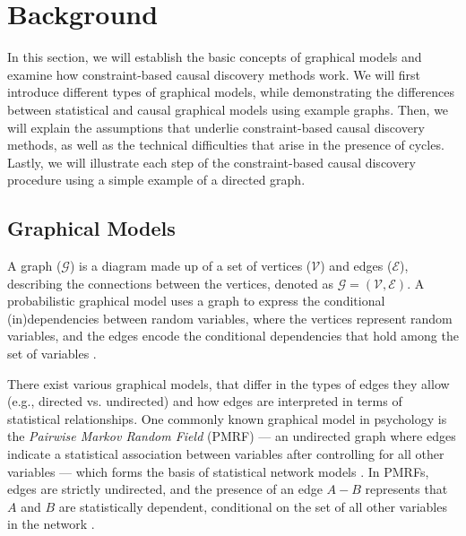 \documentclass[twoside, 11pt]{article}
\begin{document}


\section{Background}
In this section, we will establish the basic concepts of graphical models and examine how constraint-based causal discovery methods work. We will first introduce different types of graphical models, while demonstrating the differences between statistical and causal graphical models using example graphs. Then, we will explain the assumptions that underlie constraint-based causal discovery methods, as well as the technical difficulties that arise in the presence of cycles. Lastly, we will illustrate each step of the constraint-based causal discovery procedure using a simple example of a directed graph.


\subsection{Graphical Models} 

A graph ($\mathcal{G}$) is a diagram made up of a set of vertices ($\mathcal{V}$) and edges ($\mathcal{E}$), describing the connections between the vertices, denoted as $\mathcal{G} = (\mathcal{V},  \mathcal{E})$.
A probabilistic graphical model uses a graph to express the conditional (in)dependencies between random variables, where the vertices represent random variables, and the edges encode the conditional dependencies that hold among the set of variables \citep{lauritzen1996graphical}. 


There exist various graphical models, that differ in the types of edges they allow (e.g., directed vs. undirected) and how edges are interpreted in terms of statistical relationships. One commonly known graphical model in psychology is the \textit{Pairwise Markov Random Field} (PMRF) --- an undirected graph where edges indicate a statistical association between variables after controlling for all other variables ---  which forms the basis of statistical network models \citep{epskamp_gaussian_2018, epskamp_tutorial_2018}. In PMRFs, edges are strictly undirected, and the presence of an edge $A-B$ represents that $A$ and $B$ are statistically dependent, conditional on the set of all other variables in the network \citep{borsboom_network_2021}. 
\end{document}

